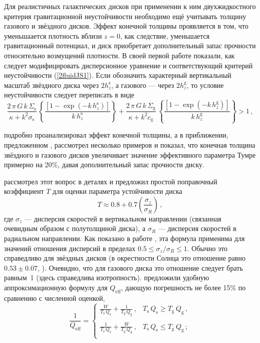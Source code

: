 \documentclass[russian,12pt]{article}
\def\be{\begin{equation}}
\def\ee{\end{equation}}
\begin{document}
Для реалистичных галактических дисков при применении к ним 
двухжидкостного критерия гравитационной неустойчивости необходимо ещё 
учитывать толщину газового и звёздного дисков. Эффект конечной толщины 
проявляется в том, что уменьшаается плотность вблизи $z = 0$, как 
следствие, уменьшается гравитационный потенциал, и диск приобретает 
дополнительный запас прочности относительно возмущений плотности. В 
своей первой работе \cite{JS84} показали, как следует модифицировать 
дисперсионное уравнение и соответствующий критерий неустойчивости 
(\ref{2fluidJS1}). Если обозначить характерный вертикальный масштаб 
звёздного диска через $2 h_z^\mathrm{s}$, а газового --- через 
$2 h_z^\mathrm{g}$, то условие неустойчивости следует переписать в виде
\begin{equation}
\frac{2\,\pi\,G\,k\,\Sigma_\mathrm{s}}{\kappa+k^2 \sigma_\mathrm{s}} \,
\left\{
\frac{\left[1 - \exp(-k\,h_z^\mathrm{s})\right]}
{k\,h_z^\mathrm{s}}
\right\} 
+ 
\frac{2\,\pi\,G\,k\,\Sigma_\mathrm{g}}{\kappa+k^2 c_\mathrm{g}} \,
\left\{
\frac{\left[1 - \exp(-k\,h_z^\mathrm{g})\right]}
{k\,h_z^\mathrm{g}}
\right\} 
> 1\, ,
\label{2fluidJS1z}
\end{equation}

\cite{Romeo92} подробно проанализировал эффект конечной толщины, а 
\cite{Elmegreen95} в приближении, предложенном \cite{JS84}, рассмотрел 
несколько примеров и показал, что конечная толщина звёздного и газового 
дисков увеличивает значение эффективного параметра Тумре примерно на 
20\%, давая дополнительный запас прочности диску.

\cite{Romeo94} рассмотрел этот вопрос в деталях и предложил простой 
поправочный коэффициент $T$ для оценки параметра устойчивости диска
\be
T \approx 0.8 + 0.7 \left( \frac{\sigma_z}{\sigma_R} \right) \, ,
\ee
где $\sigma_z$ --- дисперсия скоростей в вертикальном направлении 
(связанная очевидным образом с полутолщиной диска), а $\sigma_R$ --- 
дисперсия скоростей в радиальном направлении. Как показано в работе 
\cite{Romeo94}, эта формула применима для значений отношения дисперсий 
в пределах $0.5 \leq \sigma_z / \sigma_R \leq 1$. Обычно это справедливо для 
звёздных дисков (в окрестности Солнца это отношение равно 
$0.53 \pm 0.07$, \citealp{DB98}). 
Очевидно, что для газового диска это отношение следует брать равным~1 
(здесь справедлива изотропность). \cite{RW11} предложили удобную 
аппроксимационную формулу для $Q_\mathrm{eff}$, дающую погрешность не более 
15\% по сравнению с численной оценкой,
\be
\frac{1}{Q_\mathrm{eff}} = 
\left\{
\begin{array}{rc}
\displaystyle \frac{W}{T_\mathrm{s}\,Q_\mathrm{s}} + 
\frac{1}{T_\mathrm{g}\,Q_\mathrm{g}} \, , 
& T_\mathrm{s}\,Q_\mathrm{s} \geq T_\mathrm{g}\,Q_\mathrm{g}\, , \\
& \\
\displaystyle \frac{1}{T_\mathrm{s}\,Q_\mathrm{s}} + 
\frac{W}{T_\mathrm{g}\,Q_\mathrm{g}} \, , 
& T_\mathrm{s}\,Q_\mathrm{s} \leq T_\mathrm{g}\,Q_\mathrm{g}\,  ; \\
\end{array}
\right.
\label{RW11z}
\ee
\end{document}
